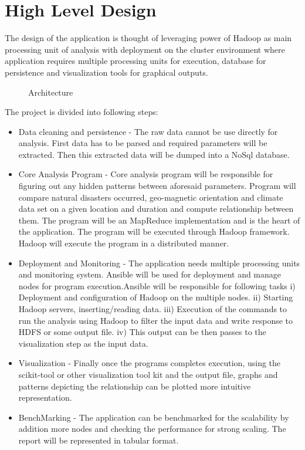 \documentclass[9pt,twocolumn,twoside]{../../styles/osajnl}
\begin{document}
\section{High Level Design}

The design of the application is thought of leveraging power of Hadoop as main processing unit of
analysis with deployment on the cluster environment where application requires multiple processing
units for execution, database for persistence and visualization tools for graphical outputs.
\begin{figure}[htbp]
\centering
{}
\caption{Architecture}
\label{Reference:false-color}
\end{figure}
The project is divided into following steps:

\begin{itemize}
\item Data cleaning and persistence - The raw data cannot be use directly for analysis. First data has to be parsed and required parameters will be extracted. Then this extracted data will be dumped into a NoSql database.
\item Core Analysis Program - Core analysis program will be responsible for figuring out any hidden patterns between aforesaid parameters. Program will compare natural disasters occurred, geo-magnetic orientation and climate data
set on a given location and duration and compute relationship between them. The program will be an
MapReduce implementation and is the heart of the application. The program will be executed through
Hadoop framework. Hadoop will execute the program in a distributed manner.
\item Deployment and Monitoring - The application needs multiple processing units and monitoring system. Ansible will be used for deployment and manage nodes for program execution.Ansible will be responsible for following tasks
i)   Deployment and configuration of Hadoop on the multiple nodes.
ii)  Starting Hadoop servers, inserting/reading data.
iii) Execution of the commands to run the analysis using Hadoop to filter the input data and write
response to HDFS or some output file.
iv)  This output can be then passes to the visualization step as the input data.
\item Visualization - Finally once the programs completes execution, using the scikit-tool or other visualization tool
kit and the output file, graphs and patterns depicting the relationship can be plotted more intuitive representation.
\item BenchMarking - The application can be benchmarked for the scalability by addition more nodes and checking the
performance for strong scaling. The report will be represented in tabular format.
\end{itemize}
\end{document}
